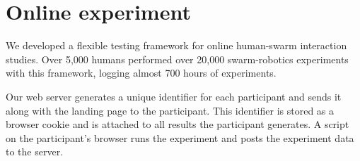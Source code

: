 \section{Online experiment}
\label{sec:expMethods}




We developed a flexible testing framework for online human-swarm interaction studies. Over 5,000 humans performed over 20,000 swarm-robotics experiments with this framework, logging almost 700 hours of experiments.



Our web server generates a unique identifier for each participant and sends it along with the landing page to the participant. 
This identifier is stored as a browser cookie and is attached to all results the participant generates. 
A script on the participant's browser runs the experiment and posts the experiment data to the server. 

